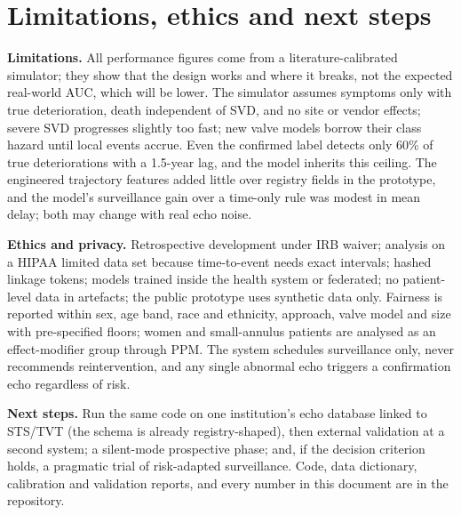 \documentclass[11pt,a4paper]{article}
\begin{document}
\section{Limitations, ethics and next steps}

\textbf{Limitations.} All performance figures come from a literature-calibrated simulator; they show that the design works and where it breaks, not the expected real-world AUC, which will be lower. The simulator assumes symptoms only with true deterioration, death independent of SVD, and no site or vendor effects; severe SVD progresses slightly too fast; new valve models borrow their class hazard until local events accrue. Even the confirmed label detects only 60\% of true deteriorations with a 1.5-year lag, and the model inherits this ceiling. The engineered trajectory features added little over registry fields in the prototype, and the model's surveillance gain over a time-only rule was modest in mean delay; both may change with real echo noise.

\textbf{Ethics and privacy.} Retrospective development under IRB waiver; analysis on a HIPAA limited data set because time-to-event needs exact intervals; hashed linkage tokens; models trained inside the health system or federated; no patient-level data in artefacts; the public prototype uses synthetic data only. Fairness is reported within sex, age band, race and ethnicity, approach, valve model and size with pre-specified floors; women and small-annulus patients are analysed as an effect-modifier group through PPM. The system schedules surveillance only, never recommends reintervention, and any single abnormal echo triggers a confirmation echo regardless of risk.

\textbf{Next steps.} Run the same code on one institution's echo database linked to STS/TVT (the schema is already registry-shaped), then external validation at a second system; a silent-mode prospective phase; and, if the decision criterion holds, a pragmatic trial of risk-adapted surveillance. Code, data dictionary, calibration and validation reports, and every number in this document are in the repository.

\printbibliography
\end{document}
